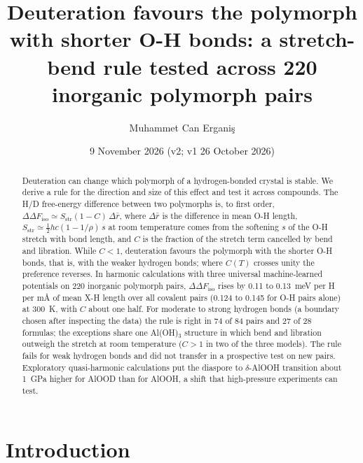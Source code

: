 \documentclass[aps,prmaterials,reprint,superscriptaddress,nofootinbib]{revtex4-2}
\newcommand{\ddF}{\Delta\Delta F_{\mathrm{iso}}}
\begin{document}
\title{Deuteration favours the polymorph with shorter O-H bonds: a stretch-bend rule tested across 220 inorganic polymorph pairs}

\author{Muhammet Can Ergani\c{s}}

\date{9 November 2026 (v2; v1 26 October 2026)}

\begin{abstract}
Deuteration can change which polymorph of a hydrogen-bonded crystal is stable. We derive a rule for the direction and size of this effect and test it across compounds. The H/D free-energy difference between two polymorphs is, to first order, $\ddF \simeq S_{\mathrm{str}}(1-C)\,\Delta\bar r$, where $\Delta\bar r$ is the difference in mean O-H length, $S_{\mathrm{str}} \simeq \tfrac{1}{2}hc(1-1/\rho)\,s$ at room temperature comes from the softening $s$ of the O-H stretch with bond length, and $C$ is the fraction of the stretch term cancelled by bend and libration. While $C<1$, deuteration favours the polymorph with the shorter O-H bonds, that is, with the weaker hydrogen bonds; where $C(T)$ crosses unity the preference reverses. In harmonic calculations with three universal machine-learned potentials on 220 inorganic polymorph pairs, $\ddF$ rises by 0.11 to 0.13~meV per H per m\AA{} of mean X-H length over all covalent pairs (0.124 to 0.145 for O-H pairs alone) at 300~K, with $C$ about one half. For moderate to strong hydrogen bonds (a boundary chosen after inspecting the data) the rule is right in 74 of 84 pairs and 27 of 28 formulas; the exceptions share one Al(OH)$_3$ structure in which bend and libration outweigh the stretch at room temperature ($C>1$ in two of the three models). The rule fails for weak hydrogen bonds and did not transfer in a prospective test on new pairs. Exploratory quasi-harmonic calculations put the diaspore to $\delta$-AlOOH transition about 1~GPa higher for AlOOD than for AlOOH, a shift that high-pressure experiments can test.
\end{abstract}

\maketitle

\section{Introduction}
\label{sec:intro}
\end{document}
